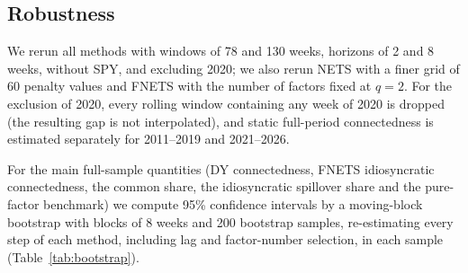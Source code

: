 \subsection{Robustness}
We rerun all methods with windows of 78 and 130 weeks, horizons of 2 and 8 weeks, without SPY, and excluding 2020; we also rerun NETS with a finer grid of 60 penalty values and FNETS with the number of factors fixed at $q=2$. For the exclusion of 2020, every rolling window containing any week of 2020 is dropped (the resulting gap is not interpolated), and static full-period connectedness is estimated separately for 2011--2019 and 2021--2026.

For the main full-sample quantities (DY connectedness, FNETS idiosyncratic connectedness, the common share, the idiosyncratic spillover share and the pure-factor benchmark) we compute 95\% confidence intervals by a moving-block bootstrap with blocks of 8 weeks and 200 bootstrap samples, re-estimating every step of each method, including lag and factor-number selection, in each sample (Table~\ref{tab:bootstrap}).
